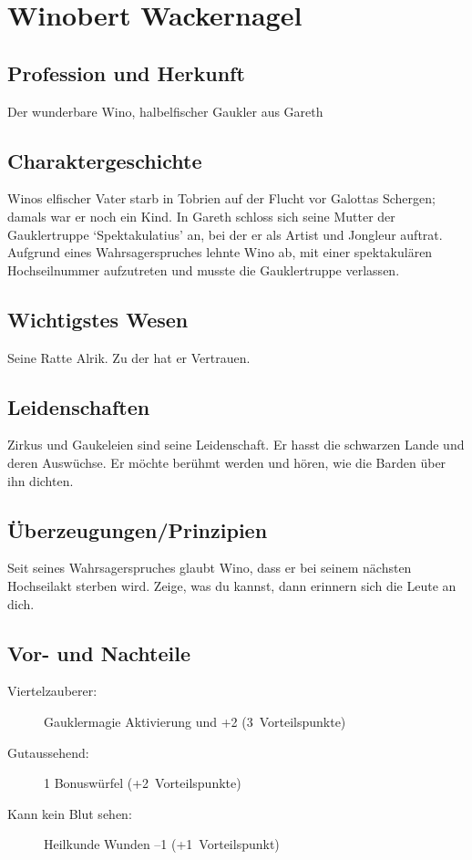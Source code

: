 \newpage\section{Winobert Wackernagel}\label{GauklerGareth}
\subsection{Profession und Herkunft}
Der wunderbare Wino, halbelfischer Gaukler aus Gareth

\subsection{Charaktergeschichte}
Winos elfischer Vater starb in Tobrien auf der Flucht vor Galottas Schergen; damals war er noch ein Kind. In Gareth schloss sich seine Mutter der Gauklertruppe `Spektakulatius' an, bei der er als Artist und Jongleur auftrat. Aufgrund eines Wahrsagerspruches lehnte Wino ab, mit einer spektakulären Hochseilnummer aufzutreten und musste die Gauklertruppe verlassen.

\subsection{Wichtigstes Wesen}
Seine Ratte Alrik. Zu der hat er Vertrauen.

\subsection{Leidenschaften}
Zirkus und Gaukeleien sind seine Leidenschaft. Er hasst die schwarzen Lande und deren Auswüchse. Er möchte berühmt werden und hören, wie die Barden über ihn dichten.

\subsection{Überzeugungen/Prinzipien}
Seit seines Wahrsagerspruches glaubt Wino, dass er bei seinem nächsten Hochseilakt sterben wird. Zeige, was du kannst, dann erinnern sich die Leute an dich.


\subsection{Vor- und Nachteile}
\begin{description}
\item[Viertelzauberer:] Gauklermagie Aktivierung und +2 (3~Vorteilspunkte)
\item[Gutaussehend:] 1 Bonuswürfel (+2~Vorteilspunkte)
\item[Kann kein Blut sehen:] Heilkunde Wunden --1 (+1~Vorteilspunkt)
\end{description}

